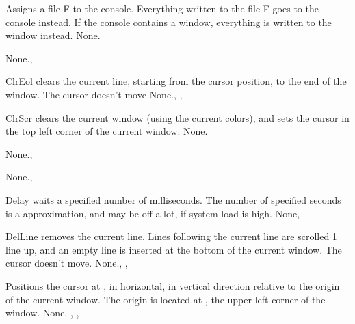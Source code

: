 {
Assigns a file F to the console. Everything written to the file F goes to
the console instead. If the console contains a window, everything is written
to the window instead.
}
{None.}{}



{None.}{, }

{ ClrEol clears the current line, starting from the cursor position, to the
end of the window. The cursor doesn't move}
{None.}{, , }



{ ClrScr clears the current window (using the current colors), 
and sets the cursor in the top left
corner of the current window.}
{None.}{  }



{None.}{, }

{None.}{, }

{Delay waits a specified number of milliseconds. The number of specified
seconds is a approximation, and may be off a lot, if system load is high.}
{None}{, }



{ DelLine removes the current line. Lines following the current line are 
scrolled 1 line up, and an empty line is inserted at the bottom of the
current window. The cursor doesn't move.}
{None.}{, , }



{ Positions the cursor at ,  in horizontal,  in
vertical direction relative to the origin of the current window. The origin
is located at , the upper-left corner of the window.
}
{None.}{ , ,  }

